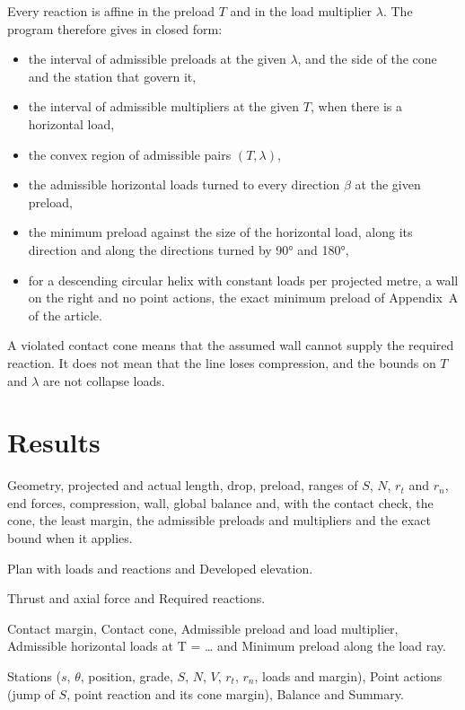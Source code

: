 \documentclass[fontsize=10.5pt,paper=a4,parskip=half,headings=normal,numbers=noenddot,
  open=any,bibliography=totoc,captions=tableheading]{scrreprt}
\numberwithin{figure}{chapter}
\numberwithin{table}{chapter}
\newcommand{\ui}[1]{{\sffamily\color{ink}#1}}
\begin{document}
Every reaction is affine in the preload $T$ and in the load multiplier $\lambda$. The program therefore
gives in closed form:
\begin{itemize}
\item the interval of admissible preloads at the given $\lambda$, and the side of the cone and the
station that govern it,
\item the interval of admissible multipliers at the given $T$, when there is a horizontal load,
\item the convex region of admissible pairs $(T,\lambda)$,
\item the admissible horizontal loads turned to every direction $\beta$ at the given preload,
\item the minimum preload against the size of the horizontal load, along its direction and along the
directions turned by 90° and 180°,
\item for a descending circular helix with constant loads per projected metre, a wall on the right and no
point actions, the exact minimum preload of Appendix~A of the article.
\end{itemize}

\begin{caution}
A violated contact cone means that the assumed wall cannot supply the required reaction. It does not
mean that the line loses compression, and the bounds on $T$ and $\lambda$ are not collapse loads.
\end{caution}

\section{Results}

\begin{description}[leftmargin=0pt,labelsep=0.5em]
\item[Summary.] Geometry, projected and actual length, drop, preload, ranges of $S$, $N$, $r_t$ and
$r_n$, end forces, compression, wall, global balance and, with the contact check, the cone, the least
margin, the admissible preloads and multipliers and the exact bound when it applies.
\item[Views.] \ui{Plan with loads and reactions} and \ui{Developed elevation}.
\item[Graphs.] \ui{Thrust and axial force} and \ui{Required reactions}.
\item[Contact.] \ui{Contact margin}, \ui{Contact cone}, \ui{Admissible preload and load multiplier},
\ui{Admissible horizontal loads at T = …} and \ui{Minimum preload along the load ray}.
\item[Tables.] \ui{Stations} ($s$, $\theta$, position, grade, $S$, $N$, $V$, $r_t$, $r_n$, loads and
margin), \ui{Point actions} (jump of $S$, point reaction and its cone margin), \ui{Balance} and
\ui{Summary}.
\end{description}
\end{document}
